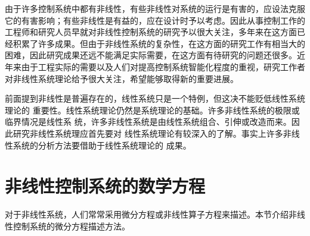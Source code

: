 由于许多控制系统中都有非线性，有些非线性对系统的运行是有害的，应设法克服它的有害影响；有些非线性是有益的，应在设计时予以考虑。因此从事控制工作的工程师和研究人员早就对非线性控制系统的研究予以很大关注，多年来在这方面已经积累了许多成果。但由于非线性系统的复杂性，在这方面的研究工作有相当大的困难，因此研究成果还远不能满足实际需要，在这方面有待研究的问题还很多。近年来由于工程实际的需要以及人们对提高控制系统智能化程度的重视，研究工作者对非线性系统理论给予很大关注，希望能够取得新的重要进展。

前面提到非线性是普遍存在的，线性系统只是一个特例，但这决不能贬低线性系统理论的
重要性。线性系统理论仍然是系统理论的基础。许多非线性系统的极限或临界情况是线性系
统，许多非线性系统是由线性系统组合、引伸或改造而来。因此研究非线性系统理应首先要对
线性系统理论有较深入的了解。事实上许多非线性系统的分析方法要借助于线性系统理论的
成果。


\section{非线性控制系统的数学方程}\label{1Bref}

对于非线性系统，人们常常采用微分方程或非线性算子方程来描述。本节介绍非线性控制系统的微分方程描述方法。

